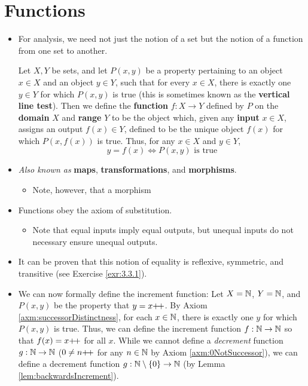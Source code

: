 \documentclass[../main.tex]{subfiles}
\begin{document}
\section{Functions}
\begin{itemize}
    \item For analysis, we need not just the notion of a set but the notion of a function from one set to another.
    \begin{dfn}[Functions]\label{dfn:functions}
        Let $X,Y$ be sets, and let $P(x,y)$ be a property pertaining to an object $x\in X$ and an object $y\in Y$, such that for every $x\in X$, there is exactly one $y\in Y$ for which $P(x,y)$ is true (this is sometimes known as the \textbf{vertical line test}). Then we define the \textbf{function} $f:X\to Y$ defined by $P$ on the \textbf{domain} $X$ and \textbf{range} $Y$ to be the object which, given any \textbf{input} $x\in X$, assigns an output $f(x)\in Y$, defined to be the unique object $f(x)$ for which $P(x,f(x))$ is true. Thus, for any $x\in X$ and $y\in Y$,
        \begin{equation*}
            y = f(x) \Longleftrightarrow P(x,y)\text{ is true}
        \end{equation*}
    \end{dfn}
    \item \emph{Also known as} \textbf{maps}, \textbf{transformations}, and \textbf{morphisms}.
    \begin{itemize}
        \item Note, however, that a morphism 
    \end{itemize}
    \item Functions obey the axiom of substitution.
    \begin{itemize}
        \item Note that equal inputs imply equal outputs, but unequal inputs do not necessary ensure unequal outputs.
    \end{itemize}
    \item It can be proven that this notion of equality is reflexive, symmetric, and transitive (see Exercise \ref{exr:3.3.1}).
    \item We can now formally define the increment function: Let $X=\mathbb{N}$, $Y=\mathbb{N}$, and $P(x,y)$ be the property that $y=x{+\!+}$. By Axiom \ref{axm:successorDistinctness}, for each $x\in\mathbb{N}$, there is exactly one $y$ for which $P(x,y)$ is true. Thus, we can define the increment function $f:\mathbb{N}\to\mathbb{N}$ so that $f(x)=x{+\!+}$ for all $x$. While we cannot define a \emph{decrement} function $g:\mathbb{N}\to\mathbb{N}$ ($0\neq n{+\!+}$ for any $n\in\mathbb{N}$ by Axiom \ref{axm:0NotSuccessor}), we can define a decrement function $g:\mathbb{N}\setminus\{0\}\to\mathbb{N}$ (by Lemma \ref{lem:backwardsIncrement}).

\end{itemize}
\end{document}
